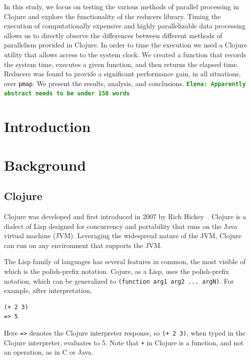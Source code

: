 \documentclass[12pt]{article}
\newcommand{\comment}[1]{{\bf \tt  {#1}}}
\newcommand{\emcomment}[1]{\textcolor{ForestGreen}{\comment{Elena: {#1}}}}
\newcommand{\clocode}[1]{{\texttt {#1}}}
\begin{document}
In this study, we focus on testing the various methods of parallel processing in Clojure and explore the functionality of the reducers library. Timing the execution of computationally expensive and highly parallelizable data processing allows us to directly observe the differences between different methods of parallelism provided in Clojure. In order to time the execution we used a Clojure utility that allows access to the system clock. We created a function that records the system time, executes a given function, and then returns the elapsed time.
Reducers was found to provide a significant performance gain, in all situations, over \clocode{pmap}.  We present the results, analysis, and conclusions.
\emcomment{Apparently abstract needs to be under 150 words}


 \newpage

\setcounter{page}{1}


\section{Introduction}\label{sec:intro}

\section{Background}\label{sec:background}

\subsection{Clojure}\label{sec:clojure}
Clojure was developed and first introduced in 2007 by Rich Hickey~\cite{Hickey:2008}. Clojure is a dialect of Lisp designed for concurrency and portability that runs on the Java virtual machine (JVM). Leveraging the widespread nature of the JVM, Clojure can run on any environment that supports the JVM. 

The Lisp family of languages has several features in common, the most visible of which is the polish-prefix notation. Cojure, as a Lisp, uses the polish-prefix notation, which can be generalized to \clocode{(function arg1 arg2 ... argN)}. For example, after interpretation, 
\begin{verbatim}
(+ 2 3)
=> 5
\end{verbatim}
Here \clocode{=>} denotes the Clojure interpreter response, so \clocode{(+ 2 3)}, when typed in the Clojure interpreter, evaluates to 5. 
Note that \clocode{+} in Clojure is a function, and not an operation, as in C or Java. 
\end{document}
